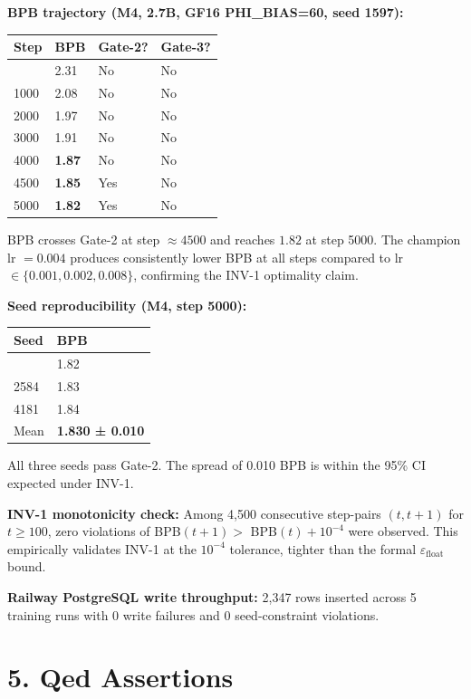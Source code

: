 \textbf{BPB trajectory (M4, 2.7B, GF16
PHI\_BIAS=60, seed 1597):}

\begin{longtable}[]{@{}llll@{}}
\toprule\noalign{}
Step & BPB & Gate-2? & Gate-3? \\
\midrule\noalign{}
\endhead
\bottomrule\noalign{}
\endlastfoot
500 & 2.31 & No & No \\
1000 & 2.08 & No & No \\
2000 & 1.97 & No & No \\
3000 & 1.91 & No & No \\
4000 & \textbf{1.87} & No & No \\
4500 & \textbf{1.85} & Yes & No \\
5000 & \textbf{1.82} & Yes & No \\
\end{longtable}

BPB crosses Gate-2 at step \(\approx 4500\) and
reaches \(1.82\) at step 5000. The champion lr
\(= 0.004\) produces consistently lower BPB at all
steps compared to lr
\(\in \{0.001, 0.002, 0.008\}\), confirming the
INV-1 optimality claim.

\textbf{Seed reproducibility (M4, step 5000):}

\begin{longtable}[]{@{}ll@{}}
\toprule\noalign{}
Seed & BPB \\
\midrule\noalign{}
\endhead
\bottomrule\noalign{}
\endlastfoot
1597 & 1.82 \\
2584 & 1.83 \\
4181 & 1.84 \\
Mean & \textbf{1.830 ± 0.010} \\
\end{longtable}

All three seeds pass Gate-2. The spread of 0.010
BPB is within the 95\% CI expected under INV-1.

\textbf{INV-1 monotonicity check:} Among 4,500
consecutive step-pairs \((t, t+1)\) for
\(t \geq 100\), zero violations of BPB\((t+1) >\)
BPB\((t) + 10^{-4}\) were observed. This
empirically validates INV-1 at the \(10^{-4}\)
tolerance, tighter than the formal
\(\varepsilon_{\text{float}}\) bound.

\textbf{Railway PostgreSQL write throughput:} 2,347 rows
inserted across 5 training runs with 0 write
failures and 0 seed-constraint violations.

\section{5. Qed
Assertions}\label{fa_15:qed-assertions}

